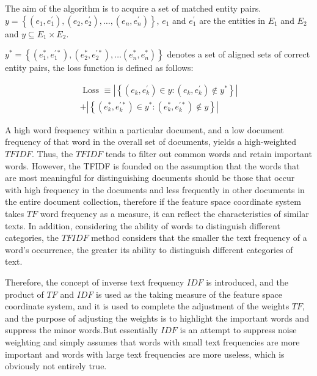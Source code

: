 \documentclass[sigconf]{acmart}
\begin{document}
The aim of the algorithm is to acquire a set of matched entity pairs. {$y=\left\{\left(e_{1}, e_{1}^{\prime}\right),\left(e_{2}, e_{2}^{\prime}\right), \ldots,\left(e_{n}, e_{n}^{\prime}\right)\right\}$}, 
$e_1$ and $e_1^'$ are the entities in $E_1$ and $E_2$ and $y \subseteq E_{1} \times E_{2}$. {$y^{*}=\left\{\left(e_{1}^{*}, e_{1}^{\prime *}\right),\left(e_{2}^{*}, e_{2}^{\prime *}\right), \ldots\left(e_{n}^{*}, e_{n}^{*}\right)\right\}$ denotes a set of aligned sets of correct entity pairs, the loss function is defined as follows:

\begin{equation}
\begin{split}
    \text { Loss } \equiv\left|\left\{\left(e_{k}, e_{k}^{\prime}\right) \in y:\left(e_{k}, e_{k}^{\prime}\right) \notin y^{*}\right\}\right|\\+\left|\left\{\left(e_{k}^{*}, e_{k}^{\prime *}\right) \in y^{*}:\left(e_{k}^{*}, e_{k}^{\prime *}\right) \notin y\right\}\right|
\end{split}
\end{equation}

A high word frequency within a particular document, and a low document frequency of that word in the overall set of documents, yields a high-weighted $TFIDF$. Thus, the $TFIDF$ tends to filter out common words and retain important words.
However, the TFIDF is founded on the assumption that the words that are most meaningful for distinguishing documents should be those that occur with high frequency in the documents and less frequently in other documents in the entire document collection, therefore if the feature space coordinate system takes $TF$ word frequency as a measure, it can reflect the characteristics of similar texts. In addition, considering the ability of words to distinguish different categories, the $TFIDF$ method considers that the smaller the text frequency of a word's occurrence, the greater its ability to distinguish different categories of text. 

Therefore, the concept of inverse text frequency $IDF$ is introduced, and the product of $TF$ and $IDF$ is used as the taking measure of the feature space coordinate system, and it is used to complete the adjustment of the weights $TF$, and the purpose of adjusting the weights is to highlight the important words and suppress the minor words.But essentially $IDF$ is an attempt to suppress noise weighting and simply assumes that words with small text frequencies are more important and words with large text frequencies are more useless, which is obviously not entirely true. 

}
\end{document}
